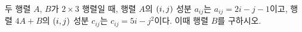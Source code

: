 두 행렬 $A$, $B$가 $2\times 3$ 행렬일 때, 행렬 $A$의 $(i{,}\mkern3mu\mathopen{}j)$ 성분 $a_{ij}$는 $a_{ij}=2i-j-1$이고, 행렬 $4A+B$의 $(i{,}\mkern3mu\mathopen{}j)$ 성분 $c_{ij}$는 $c_{ij}=5i-j^2$이다. 이때 행렬 $B$를 구하시오.
